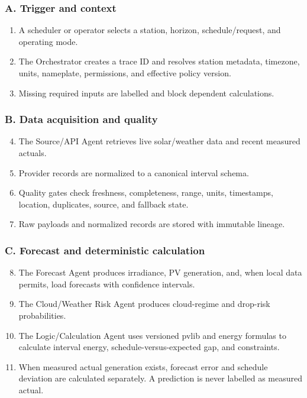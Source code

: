 \documentclass[11pt,a4paper]{article}
\begin{document}
\subsubsection*{A. Trigger and context}
\begin{enumerate}
  \item A scheduler or operator selects a station, horizon, schedule/request, and operating mode.
  \item The Orchestrator creates a trace ID and resolves station metadata, timezone, units,
        nameplate, permissions, and effective policy version.
  \item Missing required inputs are labelled and block dependent calculations.
\end{enumerate}

\subsubsection*{B. Data acquisition and quality}
\begin{enumerate}
  \setcounter{enumi}{3}
  \item The Source/API Agent retrieves live solar/weather data and recent measured actuals.
  \item Provider records are normalized to a canonical interval schema.
  \item Quality gates check freshness, completeness, range, units, timestamps, location,
        duplicates, source, and fallback state.
  \item Raw payloads and normalized records are stored with immutable lineage.
\end{enumerate}

\subsubsection*{C. Forecast and deterministic calculation}
\begin{enumerate}
  \setcounter{enumi}{7}
  \item The Forecast Agent produces irradiance, PV generation, and, when local data permits,
        load forecasts with confidence intervals.
  \item The Cloud/Weather Risk Agent produces cloud-regime and drop-risk probabilities.
  \item The Logic/Calculation Agent uses versioned pvlib and energy formulas to calculate
        interval energy, schedule-versus-expected gap, and constraints.
  \item When measured actual generation exists, forecast error and schedule deviation are
        calculated separately. A prediction is never labelled as measured actual.
\end{enumerate}
\end{document}
